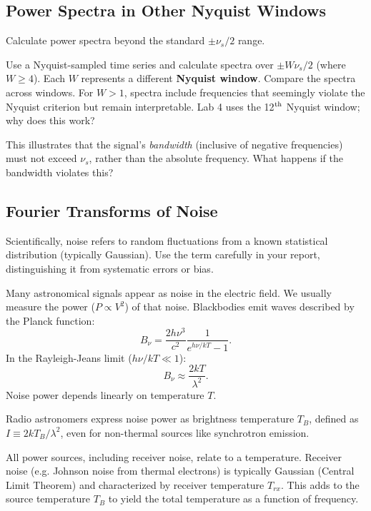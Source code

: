 \documentclass[11pt,preprint]{aastex}
\begin{document}
\subsection{Power Spectra in Other Nyquist Windows}

\noindent
Calculate power spectra beyond the standard $\pm \nu_s/2$ range.

Use a Nyquist-sampled time series and calculate spectra over $\pm W \nu_s/2$
(where $W \ge 4$).
Each $W$ represents a different \textbf{Nyquist window}.
Compare the spectra across windows.
For $W > 1$, spectra include frequencies that seemingly violate the Nyquist
criterion but remain interpretable.
Lab 4 uses the 12$^{\rm th}$ Nyquist window; why does this work?

This illustrates that the signal's {\it bandwidth} (inclusive of negative
frequencies) must not exceed $\nu_s$, rather than the absolute frequency.
What happens if the bandwidth violates this?


\subsection{Fourier Transforms of Noise}

\noindent
Scientifically, noise refers to random fluctuations from a known statistical
distribution (typically Gaussian).
Use the term carefully in your report, 
distinguishing it from systematic errors or bias.

Many astronomical signals appear as noise in the electric field.
We usually measure the power ($P \propto V^2$) of that noise.
Blackbodies emit waves described by the Planck function:
\begin{equation}
B_\nu = \frac{2h\nu^3}{c^2}\frac{1}{e^{h\nu/kT}-1}.
\end{equation}
In the Rayleigh-Jeans limit ($h\nu/kT \ll 1$):
\begin{equation}
B_\nu\approx\frac{2kT}{\lambda^2}.
\end{equation}
Noise power depends linearly on temperature $T$.

Radio astronomers express noise power as brightness temperature $T_B$,
defined as $I\equiv2kT_B/\lambda^2$,
even for non-thermal sources like synchrotron emission.

All power sources, including receiver noise, relate to a temperature.
Receiver noise (e.g. Johnson noise from thermal electrons) 
is typically Gaussian (Central Limit Theorem) and characterized by receiver
temperature $T_{rx}$.
This adds to the source temperature $T_B$ to yield the total temperature
as a function of frequency.
\end{document}
